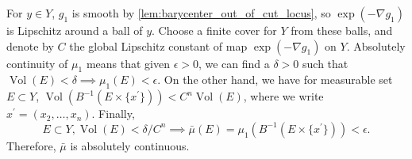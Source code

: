 For $y \in Y$, $g_1$ is smooth by \cref{lem:barycenter_out_of_cut_locus},
so $\exp( - \nabla g_1)$ is Lipschitz around a ball of $y$.
Choose a finite cover for $Y$ from these balls,
and denote by $C$ the global Lipschitz constant of map \(\exp(-\nabla g_1)\) on $Y$.
Absolutely continuity of $\mu_1$ means that given $\epsilon > 0$,
we can find a $\delta > 0$ such that $ \operatorname{Vol}(E) < \delta \implies \mu_1(E) < \epsilon$.
On the other hand, we have for measurable set $E \subset Y$,
$\operatorname{Vol}(B^{-1}( E\times \{x^\prime\})) < C^n \operatorname{Vol}(E)$,
where we write $x^\prime = (x_2, \ldots, x_n)$.
Finally,
\begin{equation}
	\label{equa:absolutely_continuity_estimation}
	E \subset Y, \operatorname{Vol}(E) < \delta / C^n \implies \bar{\mu}(E)=\mu_1(B^{-1}(E \times \{x^\prime\})) < \epsilon.
\end{equation}
Therefore, $\bar{\mu}$ is absolutely continuous.
